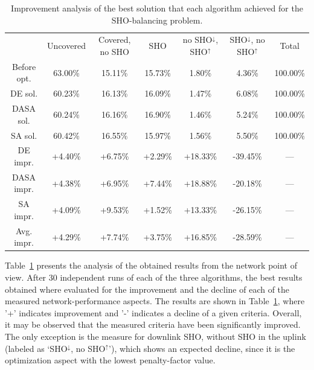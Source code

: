 \begin{table}
\centering

\caption{Improvement analysis of the best solution that each algorithm achieved
for the SHO-balancing problem.\textit{\label{tab:07-Optimization_result_analysis}}}


{\scriptsize{}}%
\begin{tabular}{ccccccc}
\cmidrule{2-7} 
 & {\scriptsize{Uncovered}} & {\scriptsize{Covered, no SHO}} & {\scriptsize{SHO}} & {\scriptsize{no SHO$^{\downarrow}$, SHO$^{\uparrow}$}} & {\scriptsize{SHO$^{\downarrow}$, no SHO$^{\uparrow}$}} & {\scriptsize{Total}}\tabularnewline\addlinespace
\midrule
{\scriptsize{Before opt.}} & {\scriptsize{63.00\%}} & {\scriptsize{15.11\%}} & {\scriptsize{15.73\%}} & {\scriptsize{1.80\%}} & {\scriptsize{4.36\%}} & {\scriptsize{100.00\%}}\tabularnewline
\cmidrule{2-7} 
{\scriptsize{DE sol.}} & {\scriptsize{60.23\%}} & {\scriptsize{16.13\%}} & {\scriptsize{16.09\%}} & {\scriptsize{1.47\%}} & {\scriptsize{6.08\%}} & {\scriptsize{100.00\%}}\tabularnewline
{\scriptsize{DASA sol.}} & {\scriptsize{60.24\%}} & {\scriptsize{16.16\%}} & {\scriptsize{16.90\%}} & {\scriptsize{1.46\%}} & {\scriptsize{5.24\%}} & {\scriptsize{100.00\%}}\tabularnewline
{\scriptsize{SA sol.}} & {\scriptsize{60.42\%}} & {\scriptsize{16.55\%}} & {\scriptsize{15.97\%}} & {\scriptsize{1.56\%}} & {\scriptsize{5.50\%}} & {\scriptsize{100.00\%}}\tabularnewline
\cmidrule{2-7} 
{\scriptsize{DE impr.}} & {\scriptsize{+4.40\%}} & {\scriptsize{+6.75\%}} & {\scriptsize{+2.29\%}} & {\scriptsize{+18.33\%}} & {\scriptsize{-39.45\%}} & {\scriptsize{---}}\tabularnewline
{\scriptsize{DASA impr.}} & {\scriptsize{+4.38\%}} & {\scriptsize{+6.95\%}} & {\scriptsize{+7.44\%}} & {\scriptsize{+18.88\%}} & {\scriptsize{-20.18\%}} & {\scriptsize{---}}\tabularnewline
{\scriptsize{SA impr.}} & {\scriptsize{+4.09\%}} & {\scriptsize{+9.53\%}} & {\scriptsize{+1.52\%}} & {\scriptsize{+13.33\%}} & {\scriptsize{-26.15\%}} & {\scriptsize{---}}\tabularnewline
\cmidrule{2-7} 
{\scriptsize{Avg. impr.}} & {\scriptsize{+4.29\%}} & {\scriptsize{+7.74\%}} & {\scriptsize{+3.75\%}} & {\scriptsize{+16.85\%}} & {\scriptsize{-28.59\%}} & {\scriptsize{---}}\tabularnewline
\bottomrule
\end{tabular}
\end{table}


Table~\ref{tab:07-Optimization_result_analysis} presents the analysis
of the obtained results from the network point of view. After 30 independent
runs of each of the three algorithms, the best results obtained where
evaluated for the improvement and the decline of each of the measured
network-performance aspects. The results are shown in Table~\ref{tab:07-Optimization_result_analysis},
where '+' indicates improvement and '-' indicates a decline of a given
criteria. Overall, it may be observed that the measured criteria have
been significantly improved. The only exception is the measure for
downlink SHO, without SHO in the uplink (labeled as `SHO$^{\downarrow}$,
no SHO$^{\uparrow}$'), which shows an expected decline, since it
is the optimization aspect with the lowest penalty-factor value.

